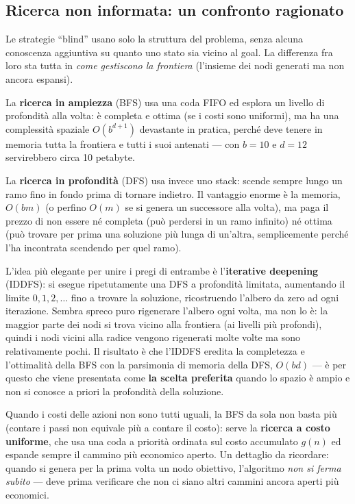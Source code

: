 \documentclass[11pt,a4paper]{article}
\begin{document}
\subsection{Ricerca non informata: un confronto ragionato}

Le strategie ``blind'' usano solo la struttura del problema, senza alcuna conoscenza aggiuntiva su quanto uno stato sia vicino al goal. La differenza fra loro sta tutta in \emph{come gestiscono la frontiera} (l'insieme dei nodi generati ma non ancora espansi).

La \textbf{ricerca in ampiezza} (BFS) usa una coda FIFO ed esplora un livello di profondità alla volta: è completa e ottima (se i costi sono uniformi), ma ha una complessità spaziale $O(b^{d+1})$ devastante in pratica, perché deve tenere in memoria tutta la frontiera e tutti i suoi antenati --- con $b=10$ e $d=12$ servirebbero circa 10 petabyte.

La \textbf{ricerca in profondità} (DFS) usa invece uno stack: scende sempre lungo un ramo fino in fondo prima di tornare indietro. Il vantaggio enorme è la memoria, $O(bm)$ (o perfino $O(m)$ se si genera un successore alla volta), ma paga il prezzo di non essere né completa (può perdersi in un ramo infinito) né ottima (può trovare per prima una soluzione più lunga di un'altra, semplicemente perché l'ha incontrata scendendo per quel ramo).

L'idea più elegante per unire i pregi di entrambe è l'\textbf{iterative deepening} (IDDFS): si esegue ripetutamente una DFS a profondità limitata, aumentando il limite $0,1,2,\dots$ fino a trovare la soluzione, ricostruendo l'albero da zero ad ogni iterazione. Sembra spreco puro rigenerare l'albero ogni volta, ma non lo è: la maggior parte dei nodi si trova vicino alla frontiera (ai livelli più profondi), quindi i nodi vicini alla radice vengono rigenerati molte volte ma sono relativamente pochi. Il risultato è che l'IDDFS eredita la completezza e l'ottimalità della BFS con la parsimonia di memoria della DFS, $O(bd)$ --- è per questo che viene presentata come \textbf{la scelta preferita} quando lo spazio è ampio e non si conosce a priori la profondità della soluzione.

Quando i costi delle azioni non sono tutti uguali, la BFS da sola non basta più (contare i passi non equivale più a contare il costo): serve la \textbf{ricerca a costo uniforme}, che usa una coda a priorità ordinata sul costo accumulato $g(n)$ ed espande sempre il cammino più economico aperto. Un dettaglio da ricordare: quando si genera per la prima volta un nodo obiettivo, l'algoritmo \emph{non si ferma subito} --- deve prima verificare che non ci siano altri cammini ancora aperti più economici.
\end{document}
